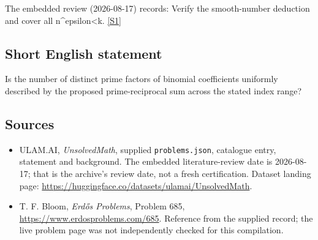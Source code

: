 \documentclass[11pt,a4paper]{article}
\newcommand{\sref}[2]{\hyperlink{source:#1:#2}{[S#2]}}
\begin{document}
The embedded review (2026-08-17) records: Verify the smooth-number deduction and cover all n\textasciicircum{}epsilon<k. \sref{statement}{1}

\subsection{Short English statement}

Is the number of distinct prime factors of binomial coefficients uniformly described by the proposed prime-reciprocal sum across the stated index range?

\subsection{Sources}

{\small

\begin{itemize}

\item[\hypertarget{source:statement:1}{S1}] ULAM.AI, \emph{UnsolvedMath}, supplied \texttt{problems.json}, catalogue entry, statement and background. The embedded literature-review date is 2026-08-17; that is the archive’s review date, not a fresh certification. Dataset landing page: \url{https://huggingface.co/datasets/ulamai/UnsolvedMath}.

\item[\hypertarget{source:statement:2}{S2}] T. F. Bloom, \emph{Erdős Problems}, Problem 685, \url{https://www.erdosproblems.com/685}. Reference from the supplied record; the live problem page was not independently checked for this compilation.

\end{itemize}

}

\label{end:statement}
\end{document}
